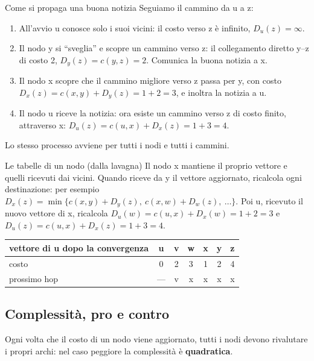 \begin{esempio}{Come si propaga una buona notizia}
Seguiamo il cammino da u a z:
\begin{enumerate}
    \item All'avvio u conosce solo i suoi vicini: il costo verso z è infinito, $D_u(z) = \infty$.
    \item Il nodo y si ``sveglia'' e scopre un cammino verso z: il collegamento diretto y--z di costo 2, $D_y(z) = c(y,z) = 2$. Comunica
          la buona notizia a x.
    \item Il nodo x scopre che il cammino migliore verso z passa per y, con costo $D_x(z) = c(x,y) + D_y(z) = 1 + 2 = 3$, e inoltra
          la notizia a u.
    \item Il nodo u riceve la notizia: ora esiste un cammino verso z di costo finito, attraverso x:
          $D_u(z) = c(u,x) + D_x(z) = 1 + 3 = 4$.
\end{enumerate}
Lo stesso processo avviene per tutti i nodi e tutti i cammini.
\end{esempio}

\begin{esempio}{Le tabelle di un nodo (dalla lavagna)}
Il nodo x mantiene il proprio vettore e quelli ricevuti dai vicini. Quando riceve da y il vettore aggiornato, ricalcola ogni
destinazione: per esempio $D_x(z) = \min\{c(x,y) + D_y(z),\ c(x,w) + D_w(z),\ \dots\}$. Poi u, ricevuto il nuovo vettore di x,
ricalcola $D_u(w) = c(u,x) + D_x(w) = 1 + 2 = 3$ e $D_u(z) = c(u,x) + D_x(z) = 1 + 3 = 4$.
\begin{center}
\begin{tabular}{l|cccccc}
\toprule
\textbf{vettore di u dopo la convergenza} & u & v & w & x & y & z \\
\midrule
costo & 0 & 2 & 3 & 1 & 2 & 4 \\
prossimo hop & --- & v & x & x & x & x \\
\bottomrule
\end{tabular}
\end{center}
\end{esempio}

\subsection{Complessità, pro e contro}

Ogni volta che il costo di un nodo viene aggiornato, tutti i nodi devono rivalutare i propri archi: nel caso peggiore la
complessità è \textbf{quadratica}.

